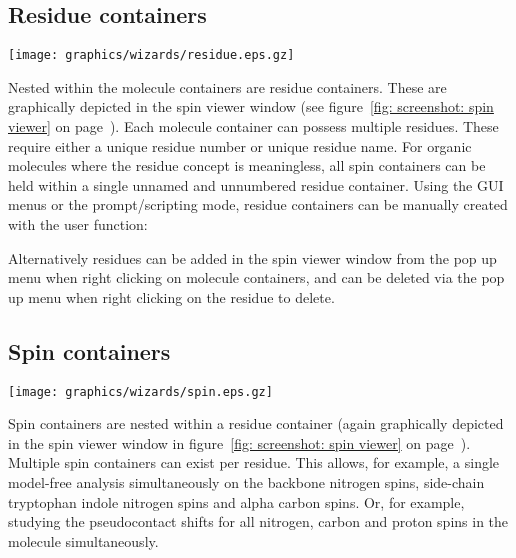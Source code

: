 \subsection{Residue containers}

\begin{figure*}[h]
\texttt{[image: graphics/wizards/residue.eps.gz]}
\end{figure*}

Nested within the molecule containers are residue containers.  These are graphically depicted in the spin viewer window (see figure~\ref{fig: screenshot: spin viewer} on page~\pageref{fig: screenshot: spin viewer}).  Each molecule container can possess multiple residues.  These require either a unique residue number or unique residue name.  For organic molecules where the residue concept is meaningless, all spin containers can be held within a single unnamed and unnumbered residue container.  Using the GUI menus or the prompt/scripting mode, residue containers can be manually created with the user function:


Alternatively residues can be added in the spin viewer window from the pop up menu when right clicking on molecule containers, and can be deleted via the pop up menu when right clicking on the residue to delete.




\subsection{Spin containers}

\begin{figure*}[h]
\texttt{[image: graphics/wizards/spin.eps.gz]}
\end{figure*}

Spin containers are nested within a residue container (again graphically depicted in the spin viewer window in figure~\ref{fig: screenshot: spin viewer} on page~\pageref{fig: screenshot: spin viewer}).  Multiple spin containers can exist per residue.  This allows, for example, a single model-free analysis simultaneously on the backbone nitrogen spins, side-chain tryptophan indole nitrogen spins and alpha carbon spins.  Or, for example, studying the pseudocontact shifts for all nitrogen, carbon and proton spins in the molecule simultaneously.

